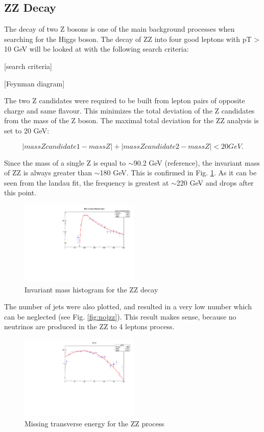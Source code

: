 \documentclass[runningheads,a4paper]{llncs}
\begin{document}

\subsection{ZZ Decay}

The decay of two Z bosons is one of the main background processes when searching for the Higgs boson. The decay of ZZ into four good leptons with pT > 10 GeV will be looked at with the following search criteria:

[search criteria] 

[Feynman diagram]

The two Z candidates were required to be built from lepton pairs of opposite charge and same flavour. This minimizes the total deviation of the Z candidates from the mass of the Z boson. The maximal total deviation for the ZZ analysis is set to 20 GeV:

\begin{equation}
|mass Z candidate 1 - mass Z| + |mass Z candidate 2 - mass Z| < 20 GeV.
\end{equation}

Since the mass of a single Z is equal to $\sim$90.2 GeV (reference), the invariant mass of ZZ is always greater than $\sim$180 GeV. This is confirmed in Fig. \ref{fig:invmzz}. As it can be seen from the landau fit, the frequency is greatest at $\sim$220 GeV and drops after this point.

\begin{figure}
\centering
\includegraphics[height=4cm]{MyInvariantMassHistoWtihFit_ZZ}
\caption{Invariant mass histogram for the ZZ decay}
\label{fig:invmzz}
\end{figure}

The number of jets were also plotted, and resulted in a very low number which can be neglected (see Fig. \ref{fig:nojzz}). This result makes sense, because no neutrinos are produced in the ZZ to 4 leptons process.

\begin{figure}
\centering
\includegraphics[height=4cm]{MTEWithFit_ZZ}
\caption{Missing transverse energy for the ZZ process}
\label{fig:mtezz}
\end{figure}
\end{document}
